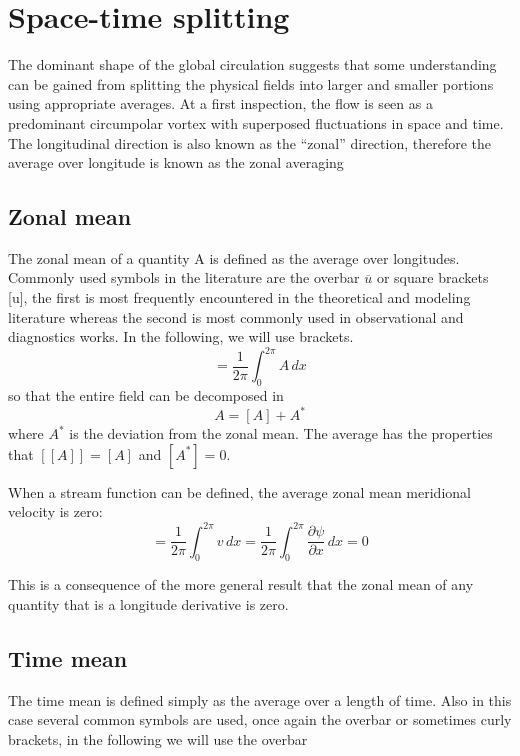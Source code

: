\section{Space-time splitting}
The dominant shape of the global circulation suggests that some understanding can be gained from splitting the physical fields into larger and smaller portions using appropriate averages. At a first inspection, the flow is seen as a predominant circumpolar vortex with superposed fluctuations in space and time. The longitudinal direction is also known as the “zonal” direction, therefore the average over longitude is known as the zonal averaging

\subsection{Zonal mean}
The zonal mean of a quantity A is defined as the average over longitudes. Commonly used symbols in the literature are the overbar $\overline{u}$ or square brackets [u], the first is most frequently encountered in the theoretical and modeling literature whereas the second is most commonly used in observational and diagnostics works. In the following, we will use brackets.
\begin{equation}
	[A] = \frac{1}{2\pi}\int_0^{2\pi} A \, dx
\end{equation}
so that the entire field can be decomposed in
\begin{equation}
	A = [A] + A^*
\end{equation}
where $A^*$ is the deviation from the zonal mean.
The average has the properties that \([[A]] = [A]\) and \([A^*]=0\).

When a stream function can be defined, the average zonal mean meridional
velocity is zero:
\begin{equation}
	= \frac{1}{2\pi}\int_0^{2\pi} v \, dx=\frac{1}{2\pi}\int_0^{2\pi} \frac{\partial \psi}{\partial x} \, dx=0
\end{equation}


This is a consequence of the more general result that the zonal mean of
any quantity that is a longitude derivative is zero.

\subsection{Time mean}
The time mean is defined simply as the average over a length of time.
Also in this case several common symbols are used, once again the
overbar or sometimes curly brackets, in the following we will use the
overbar


